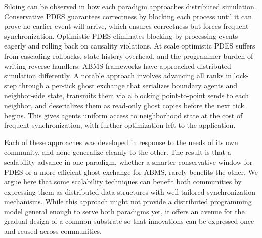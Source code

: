 Siloing can be observed in how each paradigm approaches distributed
simulation. Conservative PDES guarantees correctness
by blocking each process until it can prove no earlier
event will arrive, which ensures correctness but forces frequent synchronization.
Optimistic PDES
eliminates blocking by processing events eagerly and rolling
back on causality violations. At scale optimistic PDES suffers from cascading
rollbacks, state-history overhead, and the programmer burden of
writing reverse handlers. 
ABMS frameworks have approached distributed simulation differently. A notable approach involves 
advancing all ranks in lock-step through a per-tick ghost exchange
that serializes boundary agents and neighbor-side state, transmits
them via a blocking point-to-point sends to each neighbor, and deserializes them as read-only
ghost copies before the next tick begins. This gives agents
uniform access to neighborhood state at the cost of frequent synchronization,
with further optimization
left to the application.


Each of these approaches was developed in response to the needs of its own
community, and none generalize cleanly to the other. The result is that a
scalability advance in one paradigm, whether a smarter conservative window for
PDES or a more efficient ghost exchange for ABMS, rarely benefits the other.
%
We argue here that some scalability techniques can benefit both communities by
expressing them as distributed data structures with well tailored synchronization
mechanisms. While this approach might not provide a distributed
programming model general enough to serve both paradigms yet, it offers an avenue
for the gradual design of a common substrate so that innovations can be expressed once
and reused across communities.



